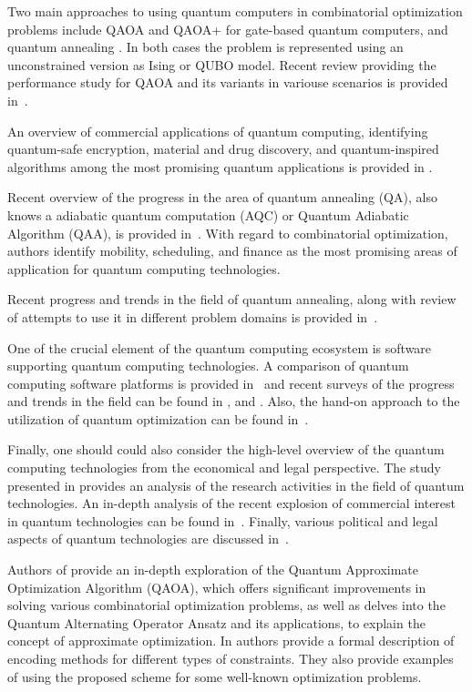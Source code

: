 \documentclass[a4paper,11pt]{article}
\begin{document}
Two main approaches to using quantum computers in combinatorial optimization problems include QAOA \cite{farhi2014quantum} and QAOA+ \cite{hadfield2019quantum} for gate-based quantum computers, and quantum annealing \cite{canivell2021startup}. In both cases the problem is represented using an unconstrained version as Ising  \cite{lucas2014ising} or QUBO \cite{glover2018tutorial} model. Recent review providing the performance study for QAOA and its variants in variouse scenarios is provided in~\cite{blekos2023review}.

An overview of commercial applications of quantum computing, identifying  quantum-safe encryption, material and drug discovery, and quantum-inspired algorithms among the most promising quantum applications is provided in \cite{bova2021commercial}. 

Recent overview of the progress in the area of quantum annealing (QA), also knows a adiabatic quantum computation (AQC) or Quantum Adiabatic Algorithm (QAA), is provided in~\cite{yarkoni2022quantum}. With regard to combinatorial optimization, authors identify mobility, scheduling, and finance as the most promising areas of application for quantum computing technologies.

Recent progress and trends in the field of quantum annealing, along with review of attempts to use it in different problem domains is provided in~\cite{yulianti2022implementation}.

One of the crucial element of the quantum computing ecosystem is software supporting quantum computing technologies. A comparison of quantum computing software platforms is provided in~\cite{larose2019overview} and recent surveys of the progress and trends in the field can be found in \cite{zhao2020quantum}, \cite{gill2021quantum} and \cite{miszczak2023symbolic}. Also, the hand-on approach to the utilization of quantum optimization can be found in~\cite{combarro2023practical}.

Finally, one should could also consider the high-level overview of the quantum computing technologies from the economical and legal perspective.
The study presented in \cite{seskir2021landscape} provides an analysis of the research activities in the field of quantum technologies. An in-depth analysis of the recent explosion of commercial interest in quantum technologies can be found in~\cite{seskir2022landscape}. Finally, various political and legal aspects of quantum technologies are discussed in~\cite{hoofnagle2021law}. 


Authors of \cite{choi2019tutorial} provide an in-depth exploration of the Quantum Approximate Optimization Algorithm (QAOA), which offers significant improvements in solving various combinatorial optimization problems, as well as delves into the Quantum Alternating Operator Ansatz and its applications,  to explain the concept of approximate optimization. In \cite{ruan2023quantum} authors provide a formal description of encoding methods for different types of constraints. They also provide examples of using the proposed scheme for some well-known optimization problems.
\end{document}
